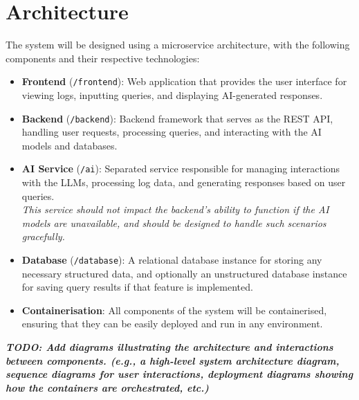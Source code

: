 \documentclass[12pt, a4paper]{article}
\begin{document}
\section{Architecture}
The system will be designed using a microservice architecture, with the following components and their respective technologies:
\begin{itemize}
    \item \textbf{Frontend} (\texttt{/frontend}): Web application that provides the user interface for viewing logs, inputting queries, and displaying AI-generated responses.
    \item \textbf{Backend} (\texttt{/backend}): Backend framework that serves as the REST API, handling user requests, processing queries, and interacting with the AI models and databases.
    \item \textbf{AI Service} (\texttt{/ai}): Separated service responsible for managing interactions with the LLMs, processing log data, and generating responses based on user queries. \\
          \textit{This service should not impact the backend's ability to function if the AI models are unavailable, and should be designed to handle such scenarios gracefully.}
    \item \textbf{Database} (\texttt{/database}): A relational database instance for storing any necessary structured data, and optionally an unstructured database instance for saving query results if that feature is implemented.
    \item \textbf{Containerisation}: All components of the system will be containerised, ensuring that they can be easily deployed and run in any environment.
\end{itemize}

{\color{orange}\textbf{\textit{TODO: Add diagrams illustrating the architecture and interactions between components. (e.g., a high-level system architecture diagram, sequence diagrams for user interactions, deployment diagrams showing how the containers are orchestrated, etc.)}}}
\end{document}
